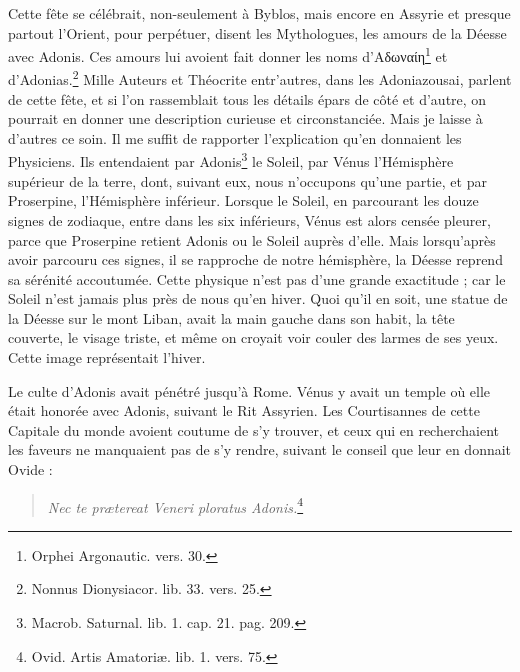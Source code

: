 \documentclass[a4paper, 18pt, oneside]{article}
\begin{document}
Cette fête se célébrait, non-seulement à Byblos, mais encore en Assyrie et presque partout l'Orient, pour perpétuer, disent les Mythologues, les amours de la Déesse avec Adonis. Ces amours lui avoient fait donner les noms d'Αδωναίη\footnote{Orphei Argonautic. vers. 30.} et d'Adonias.\footnote{Nonnus Dionysiacor. lib. 33. vers. 25.} Mille Auteurs et Théocrite entr'autres, dans les Adoniazousai, parlent de cette fête, et si l'on rassemblait tous les détails épars de côté et d'autre, on pourrait en donner une description curieuse et circonstanciée. Mais je laisse à d'autres ce soin. Il me suffit de rapporter l'explication qu'en donnaient les Physiciens. Ils entendaient par Adonis\footnote{Macrob. Saturnal. lib. 1. cap. 21. pag. 209.} le Soleil, par Vénus l'Hémisphère supérieur de la terre, dont, suivant eux, nous n'occupons qu'une partie, et par Proserpine, l'Hémisphère inférieur. Lorsque le Soleil, en parcourant les douze signes de zodiaque, entre dans les six inférieurs, Vénus est alors censée pleurer, parce que Proserpine retient Adonis ou le Soleil auprès d'elle. Mais lorsqu'après avoir parcouru ces signes, il se rapproche de notre hémisphère, la Déesse reprend sa sérénité accoutumée. Cette physique n'est pas d'une grande exactitude ; car le Soleil n'est jamais plus près de nous qu'en hiver. Quoi qu'il en soit, une statue de la Déesse sur le mont Liban, avait la main gauche dans son habit, la tête couverte, le visage triste, et même on croyait voir couler des larmes de ses yeux. Cette image représentait l'hiver.

Le culte d'Adonis avait pénétré jusqu'à Rome. Vénus y avait un temple où elle était honorée avec Adonis, suivant le Rit Assyrien. Les Courtisannes de cette Capitale du monde avoient coutume de s'y trouver, et ceux qui en recherchaient les faveurs ne manquaient pas de s'y rendre, suivant le conseil que leur en donnait Ovide :
\begin{quotation}
\emph{Nec te prætereat Veneri ploratus Adonis.}\footnote{Ovid. Artis Amatoriæ. lib. 1. vers. 75.}
\end{quotation}
\end{document}
